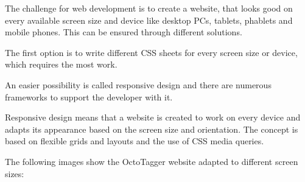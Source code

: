 The challenge for web development is to create a website, that looks good on every available screen size and device like desktop PCs, tablets, phablets and mobile phones. This can be ensured through different solutions.

The first option is to write different CSS sheets for every screen size or device, which requires the most work.

An easier possibility is called responsive design and there are numerous frameworks to support the developer with it. 

Responsive design means that a website is created to work on every device and adapts its appearance based on the screen size and orientation. The concept is based on flexible grids and layouts and the use of CSS media queries.

The following images show the OctoTagger website adapted to different screen sizes:

